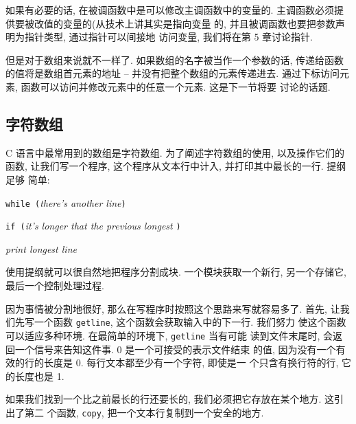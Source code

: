 如果有必要的话, 在被调函数中是可以修改主调函数中的变量的.
主调函数必须提供要被改值的变量的(从技术上讲其实是指向变量
的, 并且被调函数也要把参数声明为指针类型, 通过指针可以间接地
访问变量, 我们将在第 5 章讨论指针.

但是对于数组来说就不一样了. 如果数组的名字被当作一个参数的话,
传递给函数的值将是数组首元素的地址 -- 并没有把整个数组的元素传递进去.
通过下标访问元素, 函数可以访问并修改元素中的任意一个元素. 这是下一节将要
讨论的话题.

\subsection{字符数组}
C 语言中最常用到的数组是字符数组. 为了阐述字符数组的使用, 以及操作它们的函数,
让我们写一个程序, 这个程序从文本行中计入, 并打印其中最长的一行. 提纲足够
简单: \par
\begin{mypsudo}
    \hspace{2em}\texttt{while (}\textit{there's another line}\texttt{)}\par
    \hspace{4em}\texttt{if (}\textit{it's longer that the previous longest}
        \texttt{)} \par
    \hspace{2em}\textit{print longest line} \par
\end{mypsudo}
使用提纲就可以很自然地把程序分割成块. 一个模块获取一个新行, 另一个存储它,
最后一个控制处理过程.

因为事情被分割地很好, 那么在写程序时按照这个思路来写就容易多了. 首先, 让我 
们先写一个函数 \texttt{getline}, 这个函数会获取输入中的下一行. 我们努力
使这个函数可以适应多种环境. 在最简单的环境下, \texttt{getline} 当有可能
读到文件末尾时, 会返回一个信号来告知这件事. 0 是一个可接受的表示文件结束
的值, 因为没有一个有效的行的长度是 0. 每行文本都至少有一个字符, 即使是一
个只含有换行符的行, 它的长度也是 1.

如果我们找到一个比之前最长的行还要长的, 我们必须把它存放在某个地方. 这引出了第二
个函数, \texttt{copy}, 把一个文本行复制到一个安全的地方.

